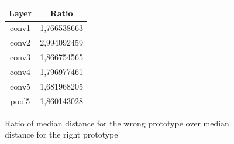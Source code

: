 \begin{figure}[htb]
\centering
\begin{tabular}{|c|c|}
  \hline
   Layer & Ratio \\
  \hline
  conv1 & 1,766538663 \\
  conv2 & 2,994092459 \\
  conv3 & 1,866754565 \\
  conv4 & 1,796977461 \\
  conv5 & 1,681968205 \\
  pool5 & 1,860143028 \\
  \hline
\end{tabular}
\caption{Ratio of median distance for the wrong prototype over median distance for the right prototype}
\label{fulltrainvalues}
\end{figure}

